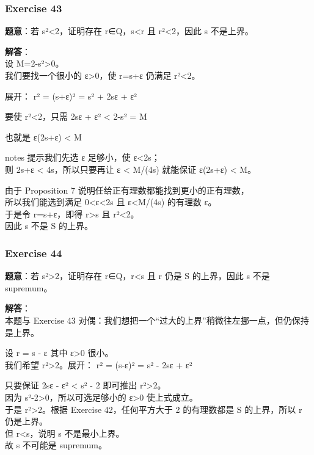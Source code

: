 \documentclass[
  11pt,
]{article}
\begin{document}
\subsubsection{Exercise 43}\label{exercise-43}

\textbf{题意}：若 s²\textless2，证明存在 r∈Q，s\textless r 且
r²\textless2，因此 s 不是上界。

\textbf{解答}：\\
设 M=2-s²\textgreater0。\\
我们要找一个很小的 ε\textgreater0，使 r=s+ε 仍满足 r²\textless2。

展开： r² = (s+ε)² = s² + 2sε + ε²

要使 r²\textless2，只需 2sε + ε² \textless{} 2-s² = M

也就是 ε(2s+ε) \textless{} M

notes 提示我们先选 ε 足够小，使 ε\textless2s；\\
则 2s+ε \textless{} 4s，所以只要再让 ε \textless{} M/(4s) 就能保证
ε(2s+ε) \textless{} M。

由于 Proposition 7 说明任给正有理数都能找到更小的正有理数，\\
所以我们能选到满足 0\textless ε\textless2s 且 ε\textless M/(4s) 的有理数
ε。\\
于是令 r=s+ε，即得 r\textgreater s 且 r²\textless2。\\
因此 s 不是 S 的上界。

\subsubsection{Exercise 44}\label{exercise-44}

\textbf{题意}：若 s²\textgreater2，证明存在 r∈Q，r\textless s 且 r 仍是
S 的上界，因此 s 不是 supremum。

\textbf{解答}：\\
本题与 Exercise 43
对偶：我们想把一个``过大的上界''稍微往左挪一点，但仍保持是上界。

设 r = s - ε 其中 ε\textgreater0 很小。\\
我们希望 r²\textgreater2。展开： r² = (s-ε)² = s² - 2sε + ε²

只要保证 2sε - ε² \textless{} s² - 2 即可推出 r²\textgreater2。\\
因为 s²-2\textgreater0，所以可选足够小的 ε\textgreater0 使上式成立。\\
于是 r²\textgreater2。根据 Exercise 42，任何平方大于 2 的有理数都是 S
的上界，所以 r 仍是上界。\\
但 r\textless s，说明 s 不是最小上界。\\
故 s 不可能是 supremum。
\end{document}
